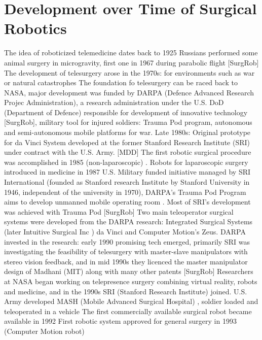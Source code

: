 \section{Development over Time of Surgical Robotics}
The idea of roboticized telemedicine dates back to 1925 \citep{bib:telemed_predict}
Russians performed some animal surgery in microgravity, first one in 1967 during parabolic flight [SurgRob]
The development of telesurgery arose in the 1970s: for environments such as war or natural catastrophes
The foundation fo telesurgery can be raced back to NASA, major development was funded by DARPA (Defence Advanced Research Projec Administration), a research administration under the U.S. DoD (Department of Defence) responsible for development of innovative technology [SurgRob], military tool for injured soldiers: Trauma Pod program, autonomous and semi-autonomous mobile platforms for war.
Late 1980s: Original prototype for da Vinci System developed at the former Stanford Research Institute (SRI) under contract with the U.S. Army. [MDD]
The first robotic surgical procedure was accomplished in 1985 (non-laparoscopic) \citep{bib:telesurg_history}. %
Robots for laparoscopic surgery introduced in medicine in 1987 \citep{bib:brown_univ}
U.S. Military funded initiative managed by SRI International (founded as Stanford research Institute by Stanford University in 1946, independent of the university in 1970), DARPA's Trauma Pod Program aims to develop unmanned mobile operating room \citep{bib:docatadist}. Most of SRI's development was achieved with Trauma Pod [SurgRob]
Two main teleoperator surgical systems were developed from the DARPA research: Integrated Surgical Systems (later Intuitive Surgical Inc \citep{bib:brown_univ}) da Vinci and Computer Motion's Zeus. \citep{bib:telesurg_history}
DARPA invested in the research: early 1990 promising tech emerged, primarily SRI was investigating the feasibility of telesurgery with master-slave manipulators with stereo vision feedback, and in mid 1990s they licenced the master manipulator design of Madhani (MIT) along with many other patents [SurgRob]
Researchers at NASA began working on telepresence surgery combining virtual reality, robots and medicine, and in the 1990s SRI (Stanford Research Institute) joined. \citep{bib:brown_univ}
U.S. Army developed MASH (Mobile Advanced Surgical Hospital) \citep{bib:brown_univ}, soldier loaded and teleoperated in a vehicle
The first commercially available surgical robot became available in 1992\citep{bib:telesurg_history}
First robotic system approved for general surgery in 1993 (Computer Motion robot) \citep{bib:telesurg_history}
